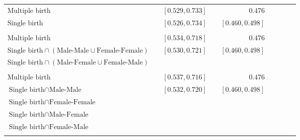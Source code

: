 \documentclass[class=article,border = 0pt,crop]{standalone}
\begin{document}
\begin{tabular}{lcrcrcrcr}
\\
$\text{Multiple birth}$&	&	$[0.529,0.733]$	&	&	$0.476$\\
$\text{Single birth}$& &\color{blue}$[0.526,0.734]$	&	&	\color{blue}$[0.460,0.498]$\\
\\
$\text{Multiple birth}$&	&	$[0.534,0.718]$	&	&	$0.476$\\
$\text{Single birth}\cap(\text{Male-Male}\cup\text{Female-Female})$& &\color{blue}$[0.530,0.721]$	&	&	\color{blue}$[0.460,0.498]$\\
$\text{Single birth}\cap(\text{Male-Female}\cup\text{Female-Male})$\\
\\
$\text{Multiple birth}$&	&	$[0.537,0.716]$	&	&	$0.476$\\
$\text{Single birth}\cap\text{Male-Male}$& &\color{blue}$[0.532,0.720]$	&	&	\color{blue}$[0.460,0.498]$\\
$\text{Single birth}\cap\text{Female-Female}$\\
$\text{Single birth}\cap\text{Male-Female}$ \\
$\text{Single birth}\cap\text{Female-Male}$\\	
\\
\bottomrule
\end{tabular}
\end{document}
